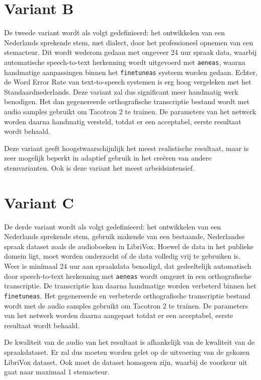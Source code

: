 \section{Variant B}
De tweede variant wordt als volgt gedefinieerd: het ontwikkelen van een Nederlands sprekende stem, met dialect, door het professioneel opnemen van een stemacteur. Dit wordt wederom gedaan met ongeveer 24 uur spraak data, waarbij automatische speech-to-text herkenning wordt uitgevoerd met \texttt{aeneas}, waarna handmatige aanpassingen binnen het \texttt{finetuneas} systeem worden gedaan. Echter, de Word Error Rate van text-to-speech systemen is erg hoog vergeleken met het Standaardnederlands. Deze variant zal dus significant meer handmatig werk benodigen. Het dan gegenereerde orthografische transcriptie bestand wordt met audio samples gebruikt om Tacotron 2 te trainen. De parameters van het netwerk worden daarna handmatig versteld, totdat er een acceptabel, eerste resultaat wordt behaald.

Deze variant geeft hoogstwaarschijnlijk het meest realistische resultaat, maar is zeer mogelijk beperkt in adaptief gebruik in het creëren van andere stemvarianten. Ook is deze variant het meest arbeidsintensief.

\section{Variant C}
De derde variant wordt als volgt gedefinieerd: het ontwikkelen van een Nederlands sprekende stem, gebruik makende van een bestaande, Nederlandse spraak dataset zoals de audioboeken in LibriVox. Hoewel de data in het publieke domein ligt, moet worden onderzocht of de data volledig vrij te gebruiken is. Weer is minimaal 24 uur aan spraakdata benodigd, dat gedeeltelijk automatisch door speech-to-text herkenning met \texttt{aeneas} wordt omgezet in een orthografische transcriptie. De transcriptie kan daarna handmatige worden verbeterd binnen het \texttt{finetuneas}. Het gegenereerde en verbeterde orthografische transcriptie bestand wordt met de audio samples gebruikt om Tacotron 2 te trainen. De parameters van het netwerk worden daarna aangepast totdat er een acceptabel, eerste resultaat wordt behaald.

De kwaliteit van de audio van het resultaat is afhankelijk van de kwaliteit van de spraakdataset. Er zal dus moeten worden gelet op de uitvoering van de gekozen LibriVox dataset. Ook moet de dataset homogeen zijn, waarbij de voorkeur uit gaat naar maximaal 1 stemacteur.

